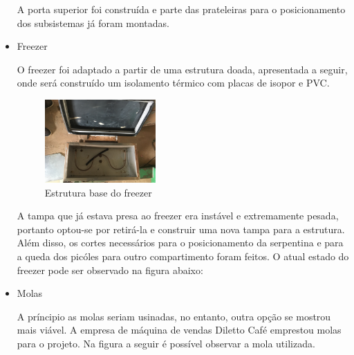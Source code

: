 \begin{itemize}

A porta superior foi construída e parte das prateleiras para o posicionamento dos subsistemas já foram montadas. 

\item Freezer

O freezer foi adaptado a partir de uma estrutura doada, apresentada a seguir, onde será construído um isolamento térmico com placas de isopor e PVC. 


   \begin{figure}[H]
	\centering
    \includegraphics[width=0.4\textwidth]{figuras/freezer}
    \caption{Estrutura base do freezer}
    \label{fig:freezer}
\end{figure}

A tampa que já estava presa ao freezer era instável e extremamente pesada, portanto optou-se por retirá-la e construir uma nova tampa para a estrutura. Além disso, os cortes necessários para o posicionamento da serpentina e para a queda dos picóles para outro compartimento foram feitos. O atual estado do freezer pode ser observado na figura abaixo:

    
\item Molas

A príncipio as molas seriam usinadas, no entanto, outra opção se mostrou mais viável. A empresa de máquina de vendas Diletto Café emprestou molas para o projeto. Na figura a seguir é possível observar a mola utilizada.



\end{itemize}
